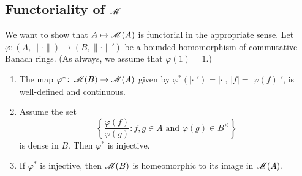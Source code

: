 \subsection{Functoriality of \texorpdfstring{$\operatorname{\mathscr{M}}$}{M}}

We want to show that $A\mapsto \operatorname{\mathscr{M}}(A)$ is functorial in the appropriate 
sense. Let $\varphi\colon (A,\|\cdot\|)\to (B,\|\cdot\|')$ be a bounded 
homomorphism of commutative Banach rings. (As always, we assume that 
$\varphi(1)=1$.)

\begin{theorem}\label{thm:functoriality-criterion}
\leavevmode
\begin{enumerate}
\item
The map $\varphi^\ast\colon \operatorname{\mathscr{M}}(B)\to \operatorname{\mathscr{M}}(A)$ given by 
$\varphi^\ast(|\cdot|') = |\cdot|$, $|f| = |\varphi(f)|'$, is well-defined and 
continuous. 

\item
Assume the set 
\[
  \left\{\frac{\varphi(f)}{\varphi(g)}\colon f,g\in A\text{ and }\varphi(g)\in B^\times\right\} 
\]
is dense in $B$. Then $\varphi^\ast$ is injective. 

\item
If $\varphi^\ast$ is injective, then $\operatorname{\mathscr{M}}(B)$ is homeomorphic to its 
image in $\operatorname{\mathscr{M}}(A)$. 
\end{enumerate}
\end{theorem}

